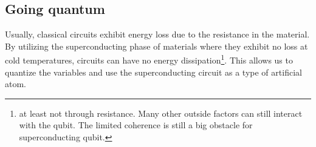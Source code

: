 
\subsection{Going quantum}
 Usually, classical circuits exhibit energy loss due to the resistance in the material. By utilizing the superconducting phase of materials where they exhibit no loss at cold temperatures, circuits can have no energy dissipation\footnote{at least not through resistance. Many other outside factors can still interact with the qubit. The limited coherence is still a big obstacle for superconducting qubit.}. This allows us to quantize the variables and use the superconducting circuit as a type of artificial atom. \cite{gennes_superconductivity_1966}

